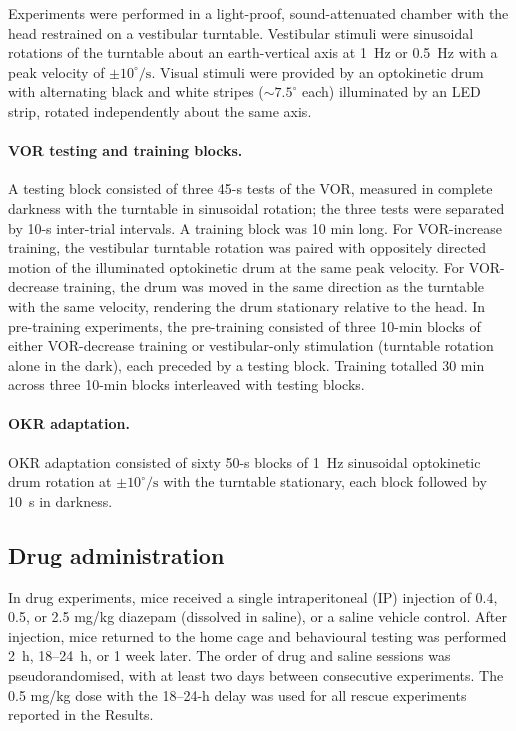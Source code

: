 \documentclass[11pt]{article}
\begin{document}
Experiments were performed in a light-proof, sound-attenuated chamber with
the head restrained on a vestibular turntable. Vestibular stimuli were
sinusoidal rotations of the turntable about an earth-vertical axis at
1~Hz or 0.5~Hz with a peak velocity of $\pm 10^{\circ}/\text{s}$. Visual
stimuli were provided by an optokinetic drum with alternating black and
white stripes ($\sim 7.5^{\circ}$ each) illuminated by an LED strip,
rotated independently about the same axis.

\paragraph{VOR testing and training blocks.}
A testing block consisted of three 45-s tests of the VOR, measured in
complete darkness with the turntable in sinusoidal rotation; the three
tests were separated by 10-s inter-trial intervals. A training block was
10 min long. For VOR-increase training, the vestibular turntable rotation
was paired with oppositely directed motion of the illuminated optokinetic
drum at the same peak velocity. For VOR-decrease training, the drum was
moved in the same direction as the turntable with the same velocity,
rendering the drum stationary relative to the head. In pre-training
experiments, the pre-training consisted of three 10-min blocks of either
VOR-decrease training or vestibular-only stimulation (turntable rotation
alone in the dark), each preceded by a testing block. Training totalled
30 min across three 10-min blocks interleaved with testing blocks.

\paragraph{OKR adaptation.}
OKR adaptation consisted of sixty 50-s blocks of 1~Hz sinusoidal optokinetic
drum rotation at $\pm 10^{\circ}/\text{s}$ with the turntable stationary,
each block followed by 10~s in darkness.

\subsection{Drug administration}

In drug experiments, mice received a single intraperitoneal (IP) injection
of 0.4, 0.5, or 2.5 mg/kg diazepam (dissolved in saline), or a saline
vehicle control. After injection, mice returned to the home cage and
behavioural testing was performed 2~h, 18--24~h, or 1 week later. The
order of drug and saline sessions was pseudorandomised, with at least two
days between consecutive experiments. The 0.5 mg/kg dose with the
18--24-h delay was used for all rescue experiments reported in the Results.
\end{document}
